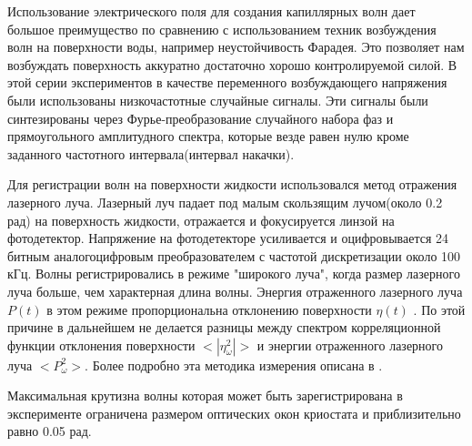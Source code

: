 	Использование электрического поля для создания капиллярных волн дает большое преимущество по сравнению с использованием техник возбуждения волн на поверхности воды, например неустойчивость Фарадея. Это позволяет нам возбуждать поверхность аккуратно достаточно хорошо контролируемой силой. В этой серии экспериментов в качестве переменного возбуждающего напряжения были использованы низкочастотные случайные сигналы. Эти сигналы были синтезированы через Фурье-преобразование случайного набора фаз и прямоугольного амплитудного спектра, которые везде равен нулю кроме заданного частотного интервала(интервал накачки).
	



	Для регистрации волн на поверхности жидкости использовался метод отражения лазерного луча. Лазерный луч падает под малым скользящим лучом(около 0.2 рад) на поверхность жидкости, отражается и фокусируется линзой на фотодетектор. Напряжение на фотодетекторе усиливается и оцифровывается 24 битным аналогоцифровым преобразователем с частотой дискретизации около 100 кГц. Волны регистрировались в режиме "широкого луча", когда размер лазерного луча больше, чем характерная длина волны. Энергия отраженного лазерного луча $P(t)$  в этом режиме пропорциональна отклонению поверхности $\eta(t)$ \cite{Brazhnikov_bound_freq}. По этой причине в дальнейшем не делается разницы между спектром корреляционной функции отклонения поверхности $<|\eta_\omega^2|>$ и энергии отраженного лазерного луча $<P_\omega^2>$. Более подробно эта методика измерения описана в \cite{Brazhnikov_IET}.

	Максимальная крутизна волны которая может быть зарегистрирована в эксперименте ограничена размером оптических окон криостата и приблизительно равно 0.05 рад.


